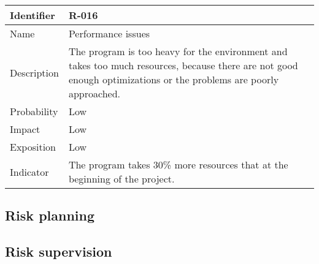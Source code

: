 \begin{table}[H]
	\begin{tabularx}{\textwidth}{|l|X|}
		\hline
		\rowcolor{gray!30}
		Identifier & \textbf{R-016} \\ \hline
		Name & Performance issues\\ \hline
		Description & The program is too heavy for the environment and takes too much resources, because there are not good enough optimizations or the problems are poorly approached.\\ \hline
		Probability & Low\\ \hline
		Impact &  Low\\ \hline
		Exposition &  Low\\ \hline
		Indicator & The program takes 30\% more resources that at the beginning of the project.\\ \hline
	\end{tabularx}
\end{table}


\subsection{Risk planning}


\subsection{Risk supervision}
